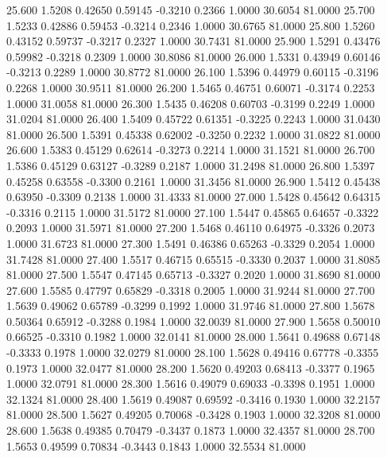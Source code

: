   25.600   1.5208   0.42650   0.59145  -0.3210   0.2366   1.0000  30.6054  81.0000
  25.700   1.5233   0.42886   0.59453  -0.3214   0.2346   1.0000  30.6765  81.0000
  25.800   1.5260   0.43152   0.59737  -0.3217   0.2327   1.0000  30.7431  81.0000
  25.900   1.5291   0.43476   0.59982  -0.3218   0.2309   1.0000  30.8086  81.0000
  26.000   1.5331   0.43949   0.60146  -0.3213   0.2289   1.0000  30.8772  81.0000
  26.100   1.5396   0.44979   0.60115  -0.3196   0.2268   1.0000  30.9511  81.0000
  26.200   1.5465   0.46751   0.60071  -0.3174   0.2253   1.0000  31.0058  81.0000
  26.300   1.5435   0.46208   0.60703  -0.3199   0.2249   1.0000  31.0204  81.0000
  26.400   1.5409   0.45722   0.61351  -0.3225   0.2243   1.0000  31.0430  81.0000
  26.500   1.5391   0.45338   0.62002  -0.3250   0.2232   1.0000  31.0822  81.0000
  26.600   1.5383   0.45129   0.62614  -0.3273   0.2214   1.0000  31.1521  81.0000
  26.700   1.5386   0.45129   0.63127  -0.3289   0.2187   1.0000  31.2498  81.0000
  26.800   1.5397   0.45258   0.63558  -0.3300   0.2161   1.0000  31.3456  81.0000
  26.900   1.5412   0.45438   0.63950  -0.3309   0.2138   1.0000  31.4333  81.0000
  27.000   1.5428   0.45642   0.64315  -0.3316   0.2115   1.0000  31.5172  81.0000
  27.100   1.5447   0.45865   0.64657  -0.3322   0.2093   1.0000  31.5971  81.0000
  27.200   1.5468   0.46110   0.64975  -0.3326   0.2073   1.0000  31.6723  81.0000
  27.300   1.5491   0.46386   0.65263  -0.3329   0.2054   1.0000  31.7428  81.0000
  27.400   1.5517   0.46715   0.65515  -0.3330   0.2037   1.0000  31.8085  81.0000
  27.500   1.5547   0.47145   0.65713  -0.3327   0.2020   1.0000  31.8690  81.0000
  27.600   1.5585   0.47797   0.65829  -0.3318   0.2005   1.0000  31.9244  81.0000
  27.700   1.5639   0.49062   0.65789  -0.3299   0.1992   1.0000  31.9746  81.0000
  27.800   1.5678   0.50364   0.65912  -0.3288   0.1984   1.0000  32.0039  81.0000
  27.900   1.5658   0.50010   0.66525  -0.3310   0.1982   1.0000  32.0141  81.0000
  28.000   1.5641   0.49688   0.67148  -0.3333   0.1978   1.0000  32.0279  81.0000
  28.100   1.5628   0.49416   0.67778  -0.3355   0.1973   1.0000  32.0477  81.0000
  28.200   1.5620   0.49203   0.68413  -0.3377   0.1965   1.0000  32.0791  81.0000
  28.300   1.5616   0.49079   0.69033  -0.3398   0.1951   1.0000  32.1324  81.0000
  28.400   1.5619   0.49087   0.69592  -0.3416   0.1930   1.0000  32.2157  81.0000
  28.500   1.5627   0.49205   0.70068  -0.3428   0.1903   1.0000  32.3208  81.0000
  28.600   1.5638   0.49385   0.70479  -0.3437   0.1873   1.0000  32.4357  81.0000
  28.700   1.5653   0.49599   0.70834  -0.3443   0.1843   1.0000  32.5534  81.0000
